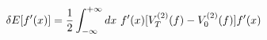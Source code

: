 \begin{equation}
\delta E [ f'(x) ] = 
 {1\over 2} \int_{-\infty}^{+\infty} dx ~ f'(x) 
                   [ V_T^{(2)} (f) - V_0^{(2)} (f) ] f'(x)
\label{deltaEfprime}
\end{equation}

